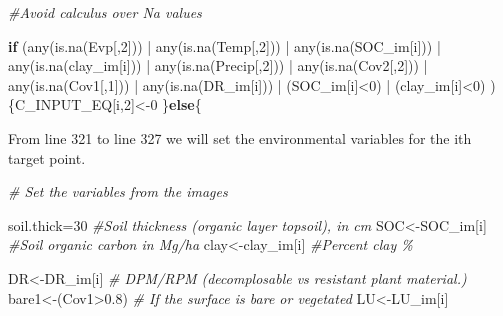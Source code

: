 \documentclass[
  10pt,
  b5paper,
]{book}
\newenvironment{Shaded}{\begin{snugshade}}{\end{snugshade}}
\newcommand{\CommentTok}[1]{\textcolor[rgb]{0.56,0.35,0.01}{\textit{#1}}}
\newcommand{\ControlFlowTok}[1]{\textcolor[rgb]{0.13,0.29,0.53}{\textbf{#1}}}
\newcommand{\DecValTok}[1]{\textcolor[rgb]{0.00,0.00,0.81}{#1}}
\newcommand{\FloatTok}[1]{\textcolor[rgb]{0.00,0.00,0.81}{#1}}
\newcommand{\FunctionTok}[1]{\textcolor[rgb]{0.00,0.00,0.00}{#1}}
\newcommand{\NormalTok}[1]{#1}
\newcommand{\OtherTok}[1]{\textcolor[rgb]{0.56,0.35,0.01}{#1}}
\newcommand{\SpecialCharTok}[1]{\textcolor[rgb]{0.00,0.00,0.00}{#1}}
\begin{document}
\begin{Shaded}
\begin{Highlighting}[]
 \CommentTok{\#Avoid calculus over Na values }
  
  \ControlFlowTok{if}\NormalTok{ (}\FunctionTok{any}\NormalTok{(}\FunctionTok{is.na}\NormalTok{(Evp[,}\DecValTok{2}\NormalTok{])) }\SpecialCharTok{|} \FunctionTok{any}\NormalTok{(}\FunctionTok{is.na}\NormalTok{(Temp[,}\DecValTok{2}\NormalTok{])) }\SpecialCharTok{|} \FunctionTok{any}\NormalTok{(}\FunctionTok{is.na}\NormalTok{(SOC\_im[i])) }\SpecialCharTok{|} \FunctionTok{any}\NormalTok{(}\FunctionTok{is.na}\NormalTok{(clay\_im[i])) }\SpecialCharTok{|} 
      \FunctionTok{any}\NormalTok{(}\FunctionTok{is.na}\NormalTok{(Precip[,}\DecValTok{2}\NormalTok{]))  }\SpecialCharTok{|}  \FunctionTok{any}\NormalTok{(}\FunctionTok{is.na}\NormalTok{(Cov2[,}\DecValTok{2}\NormalTok{]))  }\SpecialCharTok{|}  \FunctionTok{any}\NormalTok{(}\FunctionTok{is.na}\NormalTok{(Cov1[,}\DecValTok{1}\NormalTok{]))  }\SpecialCharTok{|} \FunctionTok{any}\NormalTok{(}\FunctionTok{is.na}\NormalTok{(DR\_im[i])) }\SpecialCharTok{|}  
\NormalTok{      (SOC\_im[i]}\SpecialCharTok{\textless{}}\DecValTok{0}\NormalTok{) }\SpecialCharTok{|}\NormalTok{ (clay\_im[i]}\SpecialCharTok{\textless{}}\DecValTok{0}\NormalTok{) ) \{C\_INPUT\_EQ[i,}\DecValTok{2}\NormalTok{]}\OtherTok{\textless{}{-}}\DecValTok{0}
\NormalTok{  \}}\ControlFlowTok{else}\NormalTok{\{}
\end{Highlighting}
\end{Shaded}

From line 321 to line 327 we will set the environmental variables for the ith target point.

\begin{Shaded}
\begin{Highlighting}[]
    \CommentTok{\# Set the variables from the images}
    
\NormalTok{    soil.thick}\OtherTok{=}\DecValTok{30}  \CommentTok{\#Soil thickness (organic layer topsoil), in cm}
\NormalTok{    SOC}\OtherTok{\textless{}{-}}\NormalTok{SOC\_im[i]      }\CommentTok{\#Soil organic carbon in Mg/ha }
\NormalTok{    clay}\OtherTok{\textless{}{-}}\NormalTok{clay\_im[i]        }\CommentTok{\#Percent clay \%}
    
\NormalTok{    DR}\OtherTok{\textless{}{-}}\NormalTok{DR\_im[i]              }\CommentTok{\# DPM/RPM (decomplosable vs resistant plant material.)}
\NormalTok{    bare1}\OtherTok{\textless{}{-}}\NormalTok{(Cov1}\SpecialCharTok{\textgreater{}}\FloatTok{0.8}\NormalTok{)           }\CommentTok{\# If the surface is bare or vegetated}
\NormalTok{    LU}\OtherTok{\textless{}{-}}\NormalTok{LU\_im[i]}
\end{Highlighting}
\end{Shaded}
\end{document}
